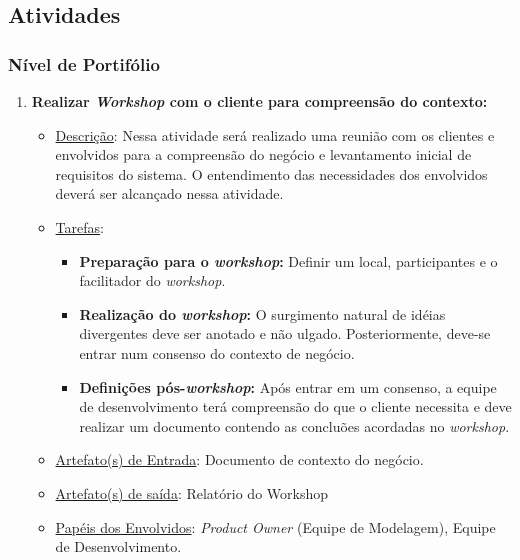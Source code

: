 \subsection{Atividades}
	\subsubsection{Nível de Portifólio}
	\begin{enumerate}[label = (\alph*)]
		\item \textbf{Realizar \textit{Workshop} com o cliente para compreensão do contexto:}
		\begin{itemize}
			\item \underline{Descrição}: Nessa atividade será realizado uma reunião com os clientes e envolvidos para a compreensão do negócio e levantamento inicial de requisitos do sistema. O entendimento das necessidades dos envolvidos deverá ser alcançado nessa atividade.
			\item \underline{Tarefas}:
			\begin{itemize}
				\item \textbf{Preparação para o \textit{workshop}:} Definir um local, participantes e o facilitador do \textit{workshop}.
				\item \textbf{Realização do \textit{workshop}:} O surgimento natural de idéias divergentes deve ser anotado e não ulgado. Posteriormente, deve-se entrar num consenso do contexto de negócio.
				\item \textbf{Definições  pós-\textit{workshop}:} Após entrar em um consenso, a equipe de desenvolvimento terá compreensão do que o cliente necessita e deve realizar um documento contendo as concluões acordadas no \textit{workshop}.
			\end{itemize}
			\item \underline{Artefato(s) de Entrada}: Documento de contexto do negócio.
			\item \underline{Artefato(s) de saída}: Relatório do Workshop
			\item \underline{Papéis dos Envolvidos}: \textit{Product Owner} (Equipe de Modelagem), Equipe de Desenvolvimento.
		\end{itemize}


\end{enumerate}
